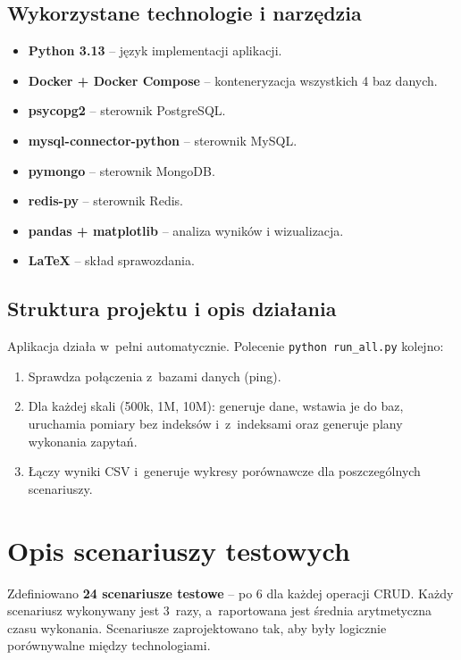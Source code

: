 \documentclass[12pt,a4paper]{article}
\begin{document}
\subsection{Wykorzystane technologie i narzędzia}
\begin{itemize}[noitemsep]
    \item \textbf{Python 3.13} -- język implementacji aplikacji.
    \item \textbf{Docker + Docker Compose} -- konteneryzacja wszystkich 4 baz danych.
    \item \textbf{psycopg2} -- sterownik PostgreSQL.
    \item \textbf{mysql-connector-python} -- sterownik MySQL.
    \item \textbf{pymongo} -- sterownik MongoDB.
    \item \textbf{redis-py} -- sterownik Redis.
    \item \textbf{pandas + matplotlib} -- analiza wyników i wizualizacja.
    \item \textbf{\LaTeX} -- skład sprawozdania.
\end{itemize}

\subsection{Struktura projektu i opis działania}
Aplikacja działa w~pełni automatycznie. Polecenie \texttt{python run\_all.py} kolejno:
\begin{enumerate}[noitemsep]
    \item Sprawdza połączenia z~bazami danych (ping).
    \item Dla każdej skali (500k, 1M, 10M): generuje dane, wstawia je do baz, uruchamia pomiary bez indeksów i~z~indeksami oraz generuje plany wykonania zapytań.
    \item Łączy wyniki CSV i~generuje wykresy porównawcze dla poszczególnych scenariuszy.
\end{enumerate}


\section{Opis scenariuszy testowych}

Zdefiniowano \textbf{24 scenariusze testowe} -- po 6 dla każdej operacji CRUD. Każdy scenariusz wykonywany jest 3~razy, a~raportowana jest średnia arytmetyczna czasu wykonania. Scenariusze zaprojektowano tak, aby były logicznie porównywalne między technologiami.
\end{document}
